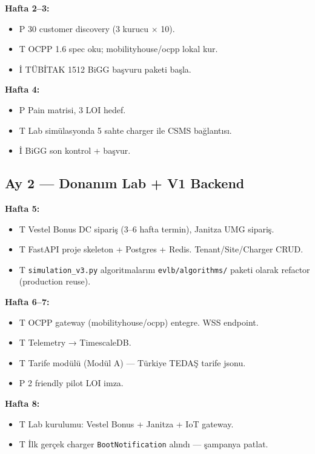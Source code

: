 \documentclass[11pt,a4paper]{article}
\begin{document}
\textbf{Hafta 2--3:}
\begin{itemize}
    \item {\color{green!50!black}P} 30 customer discovery (3 kurucu × 10).
    \item {\color{blue!50!black}T} OCPP 1.6 spec oku; mobilityhouse/ocpp lokal kur.
    \item {\color{red!50!black}İ} TÜBİTAK 1512 BiGG başvuru paketi başla.
\end{itemize}

\textbf{Hafta 4:}
\begin{itemize}
    \item {\color{green!50!black}P} Pain matrisi, 3 LOI hedef.
    \item {\color{blue!50!black}T} Lab simülasyonda 5 sahte charger ile CSMS bağlantısı.
    \item {\color{red!50!black}İ} BiGG son kontrol + başvur.
\end{itemize}

\subsection*{Ay 2 — Donanım Lab + V1 Backend}

\textbf{Hafta 5:}
\begin{itemize}
    \item {\color{blue!50!black}T} Vestel Bonus DC sipariş (3--6 hafta termin), Janitza UMG sipariş.
    \item {\color{blue!50!black}T} FastAPI proje skeleton + Postgres + Redis. Tenant/Site/Charger CRUD.
    \item {\color{blue!50!black}T} \texttt{simulation\_v3.py} algoritmalarını \texttt{evlb/algorithms/} paketi olarak refactor (production reuse).
\end{itemize}

\textbf{Hafta 6--7:}
\begin{itemize}
    \item {\color{blue!50!black}T} OCPP gateway (mobilityhouse/ocpp) entegre. WSS endpoint.
    \item {\color{blue!50!black}T} Telemetry → TimescaleDB.
    \item {\color{blue!50!black}T} Tarife modülü (Modül A) — Türkiye TEDAŞ tarife jsonu.
    \item {\color{green!50!black}P} 2 friendly pilot LOI imza.
\end{itemize}

\textbf{Hafta 8:}
\begin{itemize}
    \item {\color{blue!50!black}T} Lab kurulumu: Vestel Bonus + Janitza + IoT gateway.
    \item {\color{blue!50!black}T} İlk gerçek charger \texttt{BootNotification} alındı --- şampanya patlat.
\end{itemize}
\end{document}
